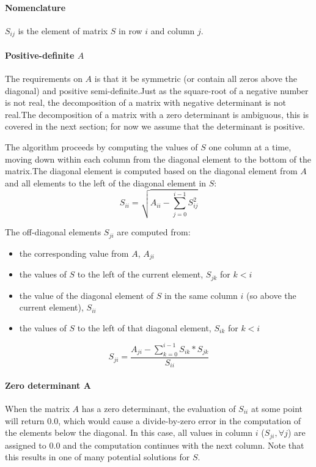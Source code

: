 \documentclass[11pt,fleqn]{report}
\begin{document}
\paragraph{Nomenclature}
$S_{ij}$ is the element of matrix $S$ in row $i$ and column $j$.

\paragraph{Positive-definite $A$}
The requirements on $A$ is that it be symmetric (or contain all zeros
above the diagonal) and positive semi-definite.Just as the square-root
of a negative number is not real, the decomposition of a matrix with
negative determinant is not real.The decomposition of a matrix with a
zero determinant is ambiguous, this is covered in the next section; for
now we assume that the determinant is positive.

The algorithm proceeds by computing the values of $S$ one column at a time,
moving down within each column from the diagonal element to the bottom of
the matrix.The diagonal element is computed based on the diagonal element
from $A$ and all elements to the left of the diagonal element in $S$:
\begin{equation}
 S_{ii} = \sqrt{A_{ii} - \sum_{j=0}^{i-1} S_{ij}^2}
\end{equation}

The off-diagonal elements $S_{ji}$ are computed from:
\begin{itemize}
 \item the corresponding value from $A$, $A_{ji}$
 \item the values of $S$ to the left of the current element,
 $S_{jk}$ for $k < i$
 \item the value of the diagonal element of $S$ in the same column $i$
 (so above the current element), $S_{ii}$
 \item the values of $S$ to the left of that diagonal element,
 $S_{ik}$ for $k < i$
\end{itemize}
\begin{equation}
 S_{ji} = \frac{A_{ji} - \sum_{k=0}^{i-1} S_{ik} * S_{jk}}{S_{ii}}
\end{equation}


\paragraph{Zero determinant A}
When the matrix $A$ has a zero determinant, the evaluation of $S_{ii}$ at
some point will return $0.0$, which would cause a divide-by-zero error in
the computation of the elements below the diagonal. In this case, all
values in column $i$ ($S_{ji},\forall j$) are assigned to $0.0$ and the
computation continues with the next column. Note that this results in one
of many potential solutions for $S$.
\end{document}
